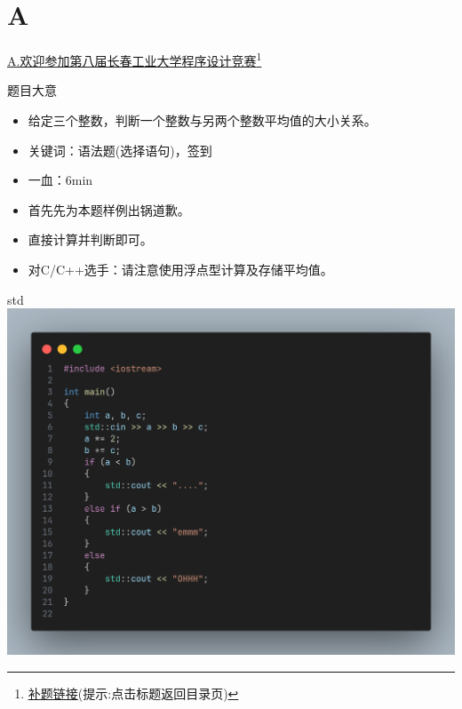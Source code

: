 \documentclass{beamer}
\begin{document}
    \section{A}
    \hypertarget{A}{}
    \begin{frame}{\hyperlink{toc}{A.欢迎参加第八届长春工业大学程序设计竞赛}\footnote{\href{https://acm816.cn/p/236}{\underline{补题链接}}(提示:点击标题返回目录页)}}
        \begin{block}{题目大意}
            \begin{itemize}
                \item 给定三个整数，判断一个整数与另两个整数平均值的大小关系。
                \item 关键词：语法题(选择语句)，签到
                \item 一血：6min
            \end{itemize}
        \end{block}
        \begin{itemize}
            \item 首先先为本题样例出锅道歉。
            \item 直接计算并判断即可。
            \item 对C/C++选手：请注意使用浮点型计算及存储平均值。
        \end{itemize}
    \end{frame}
    \begin{frame}{std}
        \centering\includegraphics[scale=0.2]{images/std/A.png}
    \end{frame}
\end{document}
